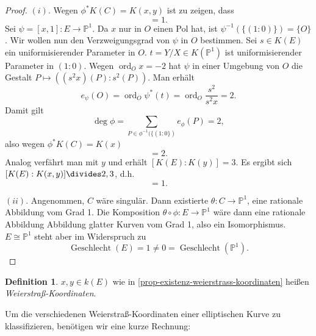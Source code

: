 \documentclass{amsart}
\theoremstyle{plain}
\theoremstyle{definition}
\newtheorem{definition}[subsection]{Definition}
\newcommand{\projspace}{\mathds{P}}
\newcommand{\genus}{\operatorname{Geschlecht}}
\newcommand{\ord}{\operatorname{ord}}
\begin{document}
\begin{proof}
	$(i)$.
	Wegen $\phi^{\ast} K(C) = K(x, y)$ ist zu zeigen, dass
	\begin{equation*}
		[K(E) : K(x, y)] = 1.
	\end{equation*}
	Sei $\psi = [x, 1] \colon E \rightarrow \projspace^1$.
	Da $x$ nur in $O$ einen Pol hat, ist $\psi^{-1}(\{(1 : 0)\}) = \{ O \}$.
	Wir wollen nun den Verzweigungsgrad von $\psi$ in $O$ bestimmen.
	Sei $s \in K(E)$ ein uniformisierender Parameter in $O$.
	$t = Y/X \in K(\projspace^1)$ ist uniformisierender Parameter in $(1 : 0)$.
	Wegen $\ord_O x = -2$ hat $\psi$ in einer Umgebung von $O$ die Gestalt $P \mapsto ((s^2x)(P) : s^2(P))$.
	Man erhält
	\begin{equation*}
		e_{\psi}(O) = \ord_O\psi^{\ast}(t) = \ord_O \frac{s^2}{s^2x} = 2.
	\end{equation*}
	Damit gilt
	\begin{equation*}
		\deg \phi = \sum_{P \in \phi^{-1}(\{(1 : 0\})} e_{\phi}(P) = 2,
	\end{equation*}
	also wegen $\phi^{\ast}K(C) = K(x)$
	\begin{equation*}
		[K(E) : K(x)] = 2.
	\end{equation*}
	Analog verfährt man mit $y$ und erhält $[K(E) : K(y)] = 3$.
	Es ergibt sich $[K(E) : K(x, y)] \divides 2, 3$, d.h.
	\begin{equation*}
		[K(E) : K(x, y)] = 1.
	\end{equation*}
	
	$(ii)$.
	Angenommen, $C$ wäre singulär.
	Dann existierte $\theta : C \rightarrow \projspace^1$, eine rationale Abbildung vom Grad 1.
	Die Komposition $\theta \circ \phi : E \rightarrow \projspace^1$ wäre dann eine rationale Abbildung Abbildung glatter Kurven vom Grad 1, also ein Isomorphismus.
	$E \cong \projspace^1$ steht aber im Widerspruch zu
	\begin{equation*}
		\genus(E) = 1 \neq 0 = \genus(\projspace^1).
	\end{equation*}
\end{proof}

\begin{definition}
	$x, y \in k(E)$ wie in \ref{prop-existenz-weierstrass-koordinaten} heißen {\it Weierstraß-Koordinaten}.
\end{definition}

Um die verschiedenen Weierstraß-Koordinaten einer elliptischen Kurve zu klassifizieren, benötigen wir eine kurze Rechnung:
\end{document}
